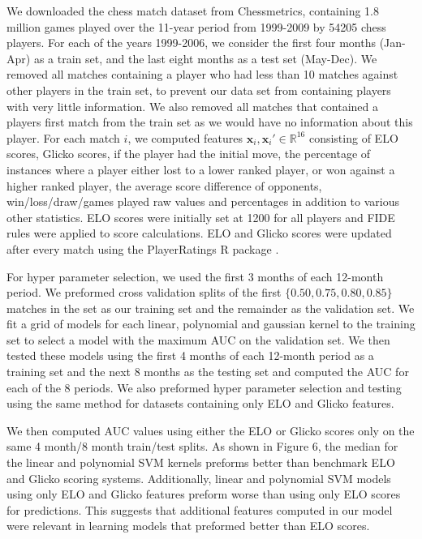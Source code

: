 \documentclass[twoside,11pt]{article}
\newcommand{\RR}{\mathbb R}
\begin{document}
We downloaded the chess match dataset from Chessmetrics, containing
1.8 million games played over the 11-year period from 1999-2009 by
54205 chess players.  For each of the years 1999-2006, we consider the
first four months (Jan-Apr) as a train set, and the last eight months
as a test set (May-Dec). 
We
removed all matches containing a player who had less than 10 matches
against other players in the train set, to prevent our data set from
containing players with very little information.  We also removed all
matches that contained a players first match from the train set as we
would have no information about this player.
For each match $i$, we computed features
$\mathbf x_i,\mathbf x_i'\in\RR^{16}$ consisting of ELO
scores, Glicko scores, if the player had the initial move, the
percentage of instances where a player either lost to a lower ranked
player, or won against a higher ranked player, the average score
difference of opponents, win/loss/draw/games played raw values and
percentages in addition to various other statistics. ELO scores were
initially set at 1200 for all players and FIDE rules were applied to
score calculations.  ELO and Glicko scores were updated after every
match using the PlayerRatings R package  \citep{play-raitings}.  

For hyper parameter selection, we used the first 3 months of each 12-month period.  We preformed cross validation splits of the first  $\{0.50,0.75,0.80,0.85\}$ matches in the set as our training set and the remainder as the validation set.  We fit a grid of models for each linear, polynomial and gaussian kernel to the training set to select a model with the maximum AUC on the validation set.  We then tested these models using the first 4 months of each 12-month period as a training set and the next 8 months as the testing set and computed the AUC for each of the 8 periods.  We also preformed hyper parameter selection and testing using the same method for datasets containing only ELO and Glicko features.

We then computed AUC values using either the ELO or Glicko scores only on the same 4 month/8 month train/test splits.  As shown in Figure 6, the median for the linear and polynomial SVM kernels preforms better than benchmark ELO and Glicko scoring systems.  Additionally, linear and polynomial SVM models using only ELO and Glicko features preform worse than using only ELO scores for predictions.  This suggests that additional features computed in our model were relevant in learning models that preformed better than ELO scores.
\end{document}
